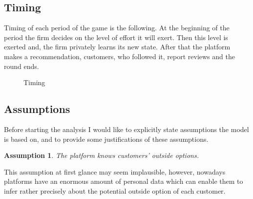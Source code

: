 \documentclass[a4paper]{article}
\newtheorem{assumption}[theorem]{Assumption}
\begin{document}
	\subsection{Timing}
	Timing of each period of the game is the following. At the beginning of the period the firm decides on the level of effort it will exert. Then this level is exerted and, the firm privately learns its new state. After that the platform makes a recommendation, customers, who followed it, report reviews and the round ends. 
	\begin{center}
	\begin{figure}[H]
	\caption{Timing}\label{fig1}
	\end{figure}
\end{center}
 	\subsection{Assumptions}
 	Before starting the analysis I would like to explicitly state assumptions the model is based on, and to provide some justifications of these assumptions.
 	\begin{assumption}
 		The platform knows customers' outside options.
 	\end{assumption}
 	This assumption at first glance may seem implausible, however, nowadays platforms have an enormous amount of personal data which can enable them to infer rather precisely about the potential outside option of each customer.
 	
\end{document}
